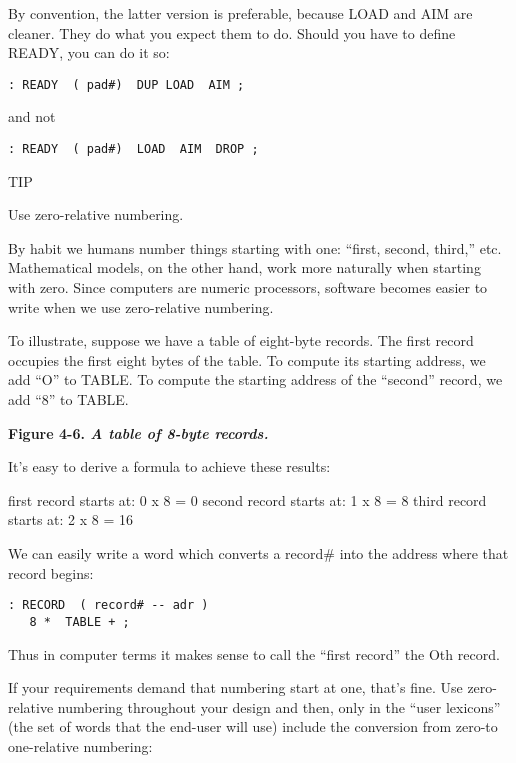 By convention, the latter version is preferable, because LOAD and AIM
are cleaner. They do what you expect them to do. Should you have to
define READY, you can do it so:

\begin{verbatim}
: READY  ( pad#)  DUP LOAD  AIM ;
\end{verbatim}

and not

\begin{verbatim}
: READY  ( pad#)  LOAD  AIM  DROP ;
\end{verbatim}

TIP

Use zero-relative numbering.

By habit we humans number things starting with one: ``first, second,
third,'' etc. Mathematical models, on the other hand, work more naturally
when starting with zero. Since computers are numeric processors, software
becomes easier to write when we use zero-relative numbering.

To illustrate, suppose we have a table of eight-byte records. The
first record occupies the first eight bytes of the table. To compute its
starting address, we add ``O'' to TABLE. To compute the starting address
of the ``second'' record, we add ``8'' to TABLE.

\bf{Figure 4-6.} \emph{A table of 8-byte records.}


It's easy to derive a formula to achieve these results:

first record starts at:    0 x 8 =  0
second record starts at:   1 x 8 =  8
third record starts at:    2 x 8 = 16

We can easily write a word which converts a record\# into the address
where that record begins:

\begin{verbatim}
: RECORD  ( record# -- adr )
   8 *  TABLE + ;
\end{verbatim}

Thus in computer terms it makes sense to call the ``first record'' the Oth
record.

If your requirements demand that numbering start at one, that's
fine. Use zero-relative numbering throughout your design and then, only
in the ``user lexicons'' (the set of words that the end-user will use)
include the conversion from zero-to one-relative numbering:

